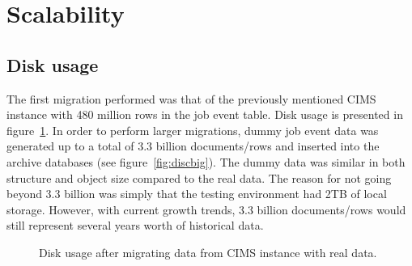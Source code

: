 

\section{Scalability}
\subsection{Disk usage}
The first migration performed was that of the previously mentioned CIMS instance with 480 million rows in the job event table. Disk usage is presented in figure~\ref{fig:disc}. In order to perform larger migrations, dummy job event data was generated up to a total of 3.3 billion documents/rows and inserted into the archive databases (see figure~\ref{fig:discbig}). The dummy data was similar in both structure and object size compared to the real data. The reason for not going beyond 3.3 billion was simply that the testing environment had 2TB of local storage. However, with current growth trends, 3.3 billion documents/rows would still represent several years worth of historical data.

\begin{figure}[h!]
\centering
{}
\caption{Disk usage after migrating data from CIMS instance with real data.}
\label{fig:disc}
\end{figure}

